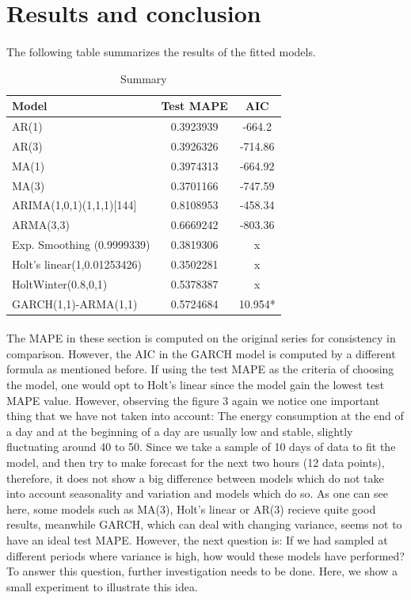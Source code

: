 \documentclass[12pt]{article}
\begin{document}
\section{Results and conclusion}
\paragraph{}
The following table summarizes the results of the fitted models.
\begin{table}[H]
  \begin{center}
    \caption{Summary}
    \label{tab:table5}
    \begin{tabular}{l|S|S} %
      \textbf{Model} & \textbf{Test MAPE} &  \textbf{AIC}\\
      \hline
  AR(1) &0.3923939  &-664.2\\
  AR(3) &0.3926326  &-714.86\\
  MA(1) &0.3974313  &-664.92\\
  MA(3) &0.3701166  &-747.59\\
  ARIMA(1,0,1)(1,1,1)[144]  &0.8108953  &-458.34\\
  ARMA(3,3) &0.6669242  &-803.36\\
  Exp. Smoothing (0.9999339)  &0.3819306  &x\\
  Holt's linear(1,0.01253426) &0.3502281  &x\\
  HoltWinter(0.8,0,1)  &0.5378387 &x\\
  GARCH(1,1)-ARMA(1,1)  &0.5724684  &10.954*\\
    \end{tabular}
  \end{center}
\end{table}

\paragraph{}
The MAPE in these section is computed on the original series for consistency in comparison. However, the AIC in the GARCH model is computed by a different formula as mentioned before. If using the test MAPE as the criteria of choosing the model, one would opt to Holt's linear since the model gain the lowest test MAPE value. However, observing the figure 3 again we notice one important thing that we have not taken into account: The energy consumption at the end of a day and at the beginning of a day are usually low and stable, slightly fluctuating around 40 to 50. Since we take a sample of 10 days of data to fit the model, and then try to make forecast for the next two hours (12 data points), therefore, it does not show a big difference between models which do not take into account seasonality and variation and models which do so. As one can see here, some models such as MA(3), Holt's linear or AR(3) recieve quite good results, meanwhile GARCH, which can deal with changing variance, seems not to have an ideal test MAPE. However, the next question is: If we had sampled at different periods where variance is high, how would these models have performed? To answer this question, further investigation needs to be done. Here, we show a small experiment to illustrate this idea.
\end{document}
